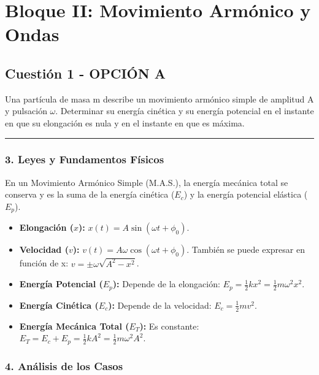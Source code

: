 \newpage

\section{Bloque II: Movimiento Armónico y Ondas}
\label{sec:ondas_2000_sep_ext}

\subsection{Cuestión 1 - OPCIÓN A}
\label{subsec:2A_2000_sep_ext}

\begin{cajaenunciado}
Una partícula de masa m describe un movimiento armónico simple de amplitud A y pulsación $\omega$. Determinar su energía cinética y su energía potencial en el instante en que su elongación es nula y en el instante en que es máxima.
\end{cajaenunciado}
\hrule

\subsubsection*{3. Leyes y Fundamentos Físicos}
En un Movimiento Armónico Simple (M.A.S.), la energía mecánica total se conserva y es la suma de la energía cinética ($E_c$) y la energía potencial elástica ($E_p$).
\begin{itemize}
    \item \textbf{Elongación ($x$):} $x(t) = A\sin(\omega t + \phi_0)$.
    \item \textbf{Velocidad ($v$):} $v(t) = A\omega\cos(\omega t + \phi_0)$. También se puede expresar en función de x: $v = \pm\omega\sqrt{A^2-x^2}$.
    \item \textbf{Energía Potencial ($E_p$):} Depende de la elongación: $E_p = \frac{1}{2}kx^2 = \frac{1}{2}m\omega^2x^2$.
    \item \textbf{Energía Cinética ($E_c$):} Depende de la velocidad: $E_c = \frac{1}{2}mv^2$.
    \item \textbf{Energía Mecánica Total ($E_T$):} Es constante: $E_T = E_c + E_p = \frac{1}{2}kA^2 = \frac{1}{2}m\omega^2A^2$.
\end{itemize}

\subsubsection*{4. Análisis de los Casos}

